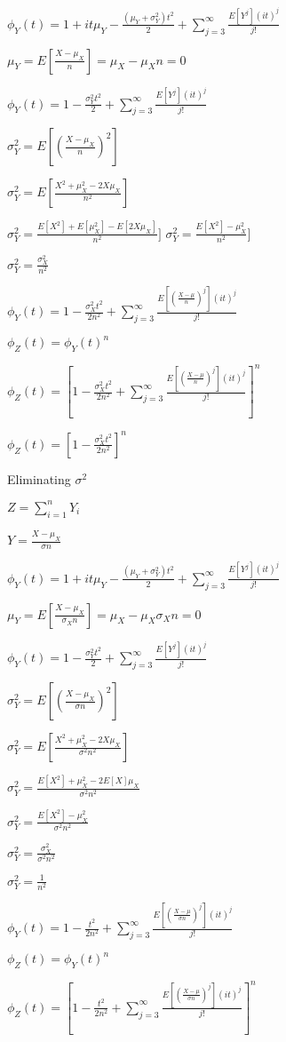 $\phi_Y(t)=1+it\mu_Y -\frac{(\mu_Y +\sigma_Y^2 )t^2}{2} +\sum_{j=3}^{\infty }\frac{E[Y^j](it)^j}{j!}$

$\mu_Y =E[\frac{X-\mu_X }{n}] ={\mu_X -\mu_X }{n}=0$

$\phi_Y(t)=1-\frac{\sigma_Y^2t^2}{2} +\sum_{j=3}^{\infty }\frac{E[Y^j](it)^j}{j!}$

$\sigma^2_Y =E[(\frac{X-\mu_X }{n})^2]$

$\sigma^2_Y =E[\frac{X^2+\mu^2_X-2X\mu_X }{n^2}]$

$\sigma^2_Y =\frac{E[X^2]+E[\mu^2_X]-E[2X\mu_X] }{n^2}]$
$\sigma^2_Y =\frac{E[X^2]-\mu^2_X}{n^2}]$

$\sigma^2_Y =\frac{\sigma^2_X}{n^2}$

$\phi_Y(t)=1-\frac{\sigma_X^2t^2}{2n^2} +\sum_{j=3}^{\infty }\frac{E[(\frac{X-\mu}{n})^j](it)^j}{j!}$

$\phi_Z(t)=\phi_Y(t)^n$

$\phi_Z(t)=[1-\frac{\sigma_X^2t^2}{2n^2} +\sum_{j=3}^{\infty }\frac{E[(\frac{X-\mu}{n})^j](it)^j}{j!}]^n$

$\phi_Z(t)=[1-\frac{\sigma_X^2t^2}{2n^2}]^n$

Eliminating \(\sigma^2 \)

$Z=\sum_{i=1}^nY_i$

$Y=\frac{X-\mu_X }{\sigma n}$

$\phi_Y(t)=1+it\mu_Y -\frac{(\mu_Y +\sigma_Y^2 )t^2}{2} +\sum_{j=3}^{\infty }\frac{E[Y^j](it)^j}{j!}$

$\mu_Y =E[\frac{X-\mu_X }{\sigma_X n}] ={\mu_X -\mu_X }{\sigma_X n}=0$

$\phi_Y(t)=1-\frac{\sigma_Y^2t^2}{2} +\sum_{j=3}^{\infty }\frac{E[Y^j](it)^j}{j!}$

$\sigma^2_Y =E[(\frac{X-\mu_X }{\sigma n})^2]$

$\sigma^2_Y =E[\frac{X^2+\mu^2_X-2X\mu_X }{\sigma^2 n^2}]$

$\sigma^2_Y =\frac{E[X^2]+\mu^2_X-2E[X]\mu_X }{\sigma^2 n^2}$

$\sigma^2_Y =\frac{E[X^2]-\mu^2_X}{\sigma^2 n^2}$

$\sigma^2_Y =\frac{\sigma^2_X}{\sigma^2 n^2}$

$\sigma^2_Y =\frac{1}{n^2}$

$\phi_Y(t)=1-\frac{t^2}{2n^2} +\sum_{j=3}^{\infty }\frac{E[(\frac{X-\mu}{\sigma n})^j](it)^j}{j!}$

$\phi_Z(t)=\phi_Y(t)^n$

$\phi_Z(t)=[1-\frac{t^2}{2n^2} +\sum_{j=3}^{\infty }\frac{E[(\frac{X-\mu}{\sigma n})^j](it)^j}{j!}]^n$

